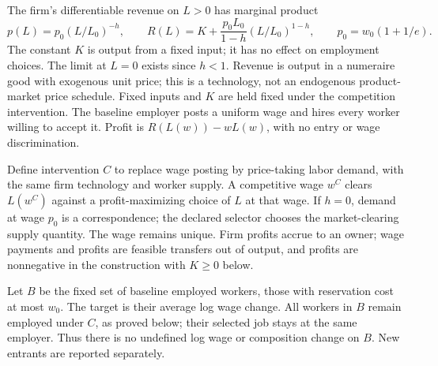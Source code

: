 \documentclass[11pt]{article}
\theoremstyle{remark}
\begin{document}
The firm's differentiable revenue on $L>0$ has marginal product
\[
 p(L)=p_0(L/L_0)^{-h},\qquad
 R(L)=K+\frac{p_0L_0}{1-h}(L/L_0)^{1-h},\qquad
 p_0=w_0(1+1/e). \tag{2}
\]
The constant $K$ is output from a fixed input; it has no effect on employment
choices. The limit at $L=0$ exists since $h<1$. Revenue is output in a
numeraire good with exogenous unit price; this is a technology, not an
endogenous product-market price schedule. Fixed inputs and $K$ are held
fixed under the competition intervention. The baseline employer posts a
uniform wage and hires every worker willing to accept it. Profit is
$R(L(w))-wL(w)$, with no entry or wage discrimination.

Define intervention $C$ to replace wage posting by price-taking labor
demand, with the same firm technology and worker supply. A competitive
wage $w^C$ clears $L(w^C)$ against a profit-maximizing choice of $L$ at
that wage. If $h=0$, demand at wage $p_0$ is a correspondence; the declared
selector chooses the market-clearing supply quantity. The wage remains
unique. Firm profits accrue to an owner; wage payments and profits are
feasible transfers out of output, and profits are nonnegative in the
construction with $K\geq0$ below.

Let $B$ be the fixed set of baseline employed workers, those with
reservation cost at most $w_0$. The target is their average log wage
change. All workers in $B$ remain employed under $C$, as proved below;
their selected job stays at the same employer. Thus there is no undefined
log wage or composition change on $B$. New entrants are reported separately.
\end{document}

